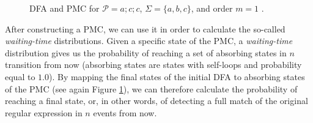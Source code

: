 \begin{figure}[!ht]
\begin{centering}
\hfill
{}
\caption{DFA and PMC for $\mathcal{P}=a ; c ; c$,  $\Sigma=\{a,b,c\}$, and order $m=1$  \cite{alevizos2017event}.}
\label{fig:dfa_mc_example}
\end{centering}
\end{figure}


After constructing a PMC, we can use it in order to calculate the so-called \textit{waiting-time} distributions.
Given a specific state of the PMC, a \textit{waiting-time} distribution gives us the probability of reaching a set of absorbing states in $n$ transition from now (absorbing states are states with self-loops and probability equal to $1.0$).
By mapping the final states of the initial DFA to absorbing states of the PMC
(see again Figure \ref{fig:dfa_mc_example}),
we can therefore calculate the probability of reaching a final state,
or, in other words, of detecting a full match of the original regular expression in $n$ events from now.


